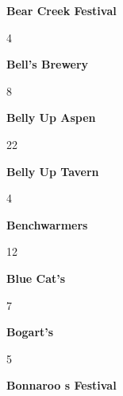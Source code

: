 \newline 
\begin{center}\textbf{Bear Creek  Festival}\end{center}
\begin{center}4\end{center} 
\newline 
\begin{center}\textbf{Bell's Brewery}\end{center}
\begin{center}8\end{center} 
\newline 
\begin{center}\textbf{Belly Up Aspen}\end{center}
\begin{center}22\end{center} 
\newline 
\begin{center}\textbf{Belly Up Tavern}\end{center}
\begin{center}4\end{center} 
\newline 
\begin{center}\textbf{Benchwarmers}\end{center}
\begin{center}12\end{center} 
\newline 
\begin{center}\textbf{Blue Cat's}\end{center}
\begin{center}7\end{center} 
\newline 
\begin{center}\textbf{Bogart's}\end{center}
\begin{center}5\end{center} 
\newline 
\begin{center}\textbf{Bonnaroo s Festival}\end{center}
